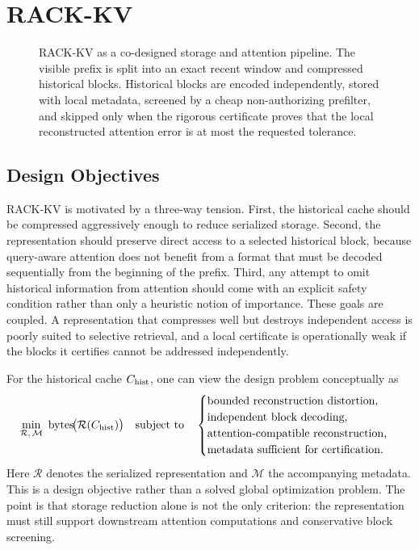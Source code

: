 \section{RACK-KV}

\begin{figure}[t]
  \centering
  
  \caption{RACK-KV as a co-designed storage and attention pipeline. The visible prefix is split into an exact recent window and compressed historical blocks. Historical blocks are encoded independently, stored with local metadata, screened by a cheap non-authorizing prefilter, and skipped only when the rigorous certificate proves that the local reconstructed attention error is at most the requested tolerance.}
  \label{fig:overview}
\end{figure}

\subsection{Design Objectives}

RACK-KV is motivated by a three-way tension. First, the historical cache should be compressed aggressively enough to reduce serialized storage. Second, the representation should preserve direct access to a selected historical block, because query-aware attention does not benefit from a format that must be decoded sequentially from the beginning of the prefix. Third, any attempt to omit historical information from attention should come with an explicit safety condition rather than only a heuristic notion of importance. These goals are coupled. A representation that compresses well but destroys independent access is poorly suited to selective retrieval, and a local certificate is operationally weak if the blocks it certifies cannot be addressed independently.

For the historical cache \(C_{\mathrm{hist}}\), one can view the design problem conceptually as
\begin{equation}
  \min_{\mathcal{R},\,\mathcal{M}} \ \operatorname{bytes}\!\bigl(\mathcal{R}(C_{\hist})\bigr)
  \quad
  \text{subject to}
  \quad
  \begin{cases}
    \text{bounded reconstruction distortion,}\\
    \text{independent block decoding,}\\
    \text{attention-compatible reconstruction,}\\
    \text{metadata sufficient for certification.}
  \end{cases}
\end{equation}
Here \(\mathcal{R}\) denotes the serialized representation and \(\mathcal{M}\) the accompanying metadata. This is a design objective rather than a solved global optimization problem. The point is that storage reduction alone is not the only criterion: the representation must still support downstream attention computations and conservative block screening.

